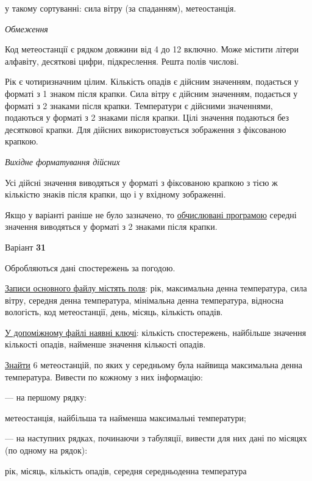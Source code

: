 \documentclass[11pt, ukrainian]{article}
\begin{document}
{\noindent}у такому сортуванні: сила вітру (за спаданням), метеостанція.


\bigskip\textit{Обмеження}

Код метеостанції є рядком довжини від 4 до 12 включно.
Може містити літери алфавіту, десяткові цифри, підкреслення. Решта полів числові.

Рік є чотиризначним цілим.
Кількість опадів є дійсним значенням, подається у форматі з 1 знаком після крапки.
Сила вітру є дійсним значенням, подається у форматі з 2 знаками після крапки.
Температури є дійсними значеннями, подаються у форматі з 2 знаками після крапки.
Цілі значення подаються без десяткової крапки.
Для дійсних використовується зображення з фіксованою крапкою.

\textit{Вихідне форматування дійсних}

Усі дійсні значення виводяться у форматі з фіксованою крапкою з тією ж кількістю знаків після крапки, що і у вхідному зображенні.

Якщо у варіанті раніше не було зазначено, то \underline{обчислювані програмою} середні значення виводяться у форматі з 2 знаками після крапки.


\par
\newpage
{\center Варіант  \No \textbf { 31 }\par}
\bigskip
Обробляються дані спостережень за погодою. 

\underline{Записи основного файлу містять поля}: рік, максимальна денна температура, сила вітру, середня денна температура, мінімальна денна температура, відносна вологість, код метеостанції, день, місяць, кількість опадів.

\underline{У допоміжному файлі наявні ключі}: кількість спостережень, найбільше значення кількості опадів, найменше значення кількості опадів.

\underline{Знайти} 6 метеостанцій, по яких у середньому була найвища максимальна денна температура. Вивести по кожному з них інформацію:\par
{\noindent}--- на першому рядку:\par
метеостанція, найбільша та найменша максимальні температури;

{\noindent}--- на наступних рядках, починаючи з табуляції, вивести для них дані по місяцях (по одному на рядок):\par
рік, місяць, кількість опадів, середня середньоденна температура
\end{document}
